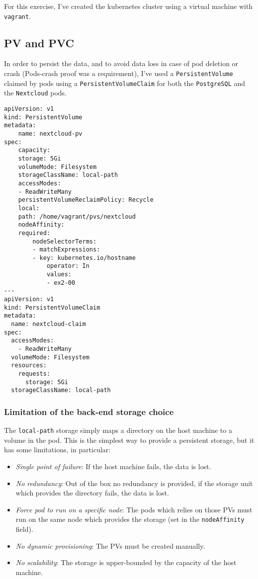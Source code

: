 For this exercise, I've created the kubernetes cluster using a virtual machine with \texttt{vagrant}.


\subsection{PV and PVC}

In order to persist the data, and to avoid data loss in case of pod deletion or crash (Pods-crash proof was a requirement), I've used a \texttt{PersistentVolume} claimed by pods using a \texttt{PersistentVolumeClaim} for both the \texttt{PostgreSQL} and the \texttt{Nextcloud} pods.

\begin{lstlisting}
apiVersion: v1
kind: PersistentVolume
metadata:
    name: nextcloud-pv
spec:
    capacity:
    storage: 5Gi
    volumeMode: Filesystem
    storageClassName: local-path
    accessModes:
    - ReadWriteMany
    persistentVolumeReclaimPolicy: Recycle
    local:
    path: /home/vagrant/pvs/nextcloud
    nodeAffinity:
    required:
        nodeSelectorTerms:
        - matchExpressions:
        - key: kubernetes.io/hostname
            operator: In
            values:
            - ex2-00
---
apiVersion: v1
kind: PersistentVolumeClaim
metadata:
  name: nextcloud-claim
spec:
  accessModes:
    - ReadWriteMany
  volumeMode: Filesystem
  resources:
    requests:
      storage: 5Gi
  storageClassName: local-path
\end{lstlisting}

\subsubsection{Limitation of the back-end storage choice}

The \texttt{local-path} storage simply maps a directory on the host machine to a volume in the pod.
This is the simplest way to provide a persistent storage, but it has some limitations, in particular: 

\begin{itemize}
    \itemsep0em
    \item \textit{Single point of failure}: If the host machine fails, the data is lost.
    \item \textit{No redundancy}: Out of the box no redundancy is provided, if the storage unit which provides the directory fails, the data is lost.
    \item \textit{Force pod to run on a specific node}: The pods which relies on those PVs must run on the same node which provides the storage (set in the \texttt{nodeAffinity} field).
    \item \textit{No dynamic provisioning}: The PVs must be created manually.
    \item \textit{No scalability}: The storage is upper-bounded by the capacity of the host machine.
\end{itemize}

